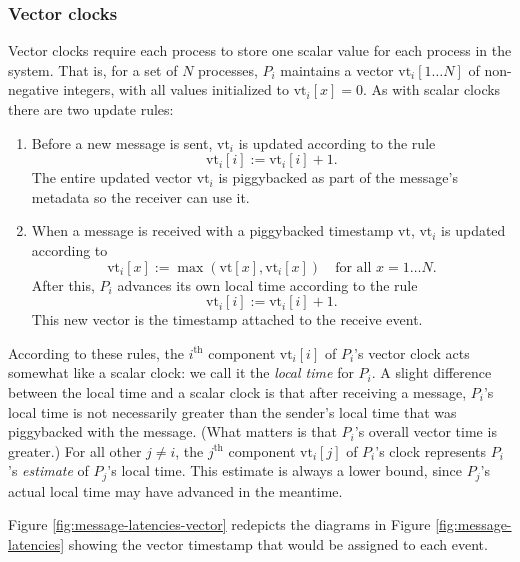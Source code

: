 \documentclass[]             %
{NASA}                       %
\theoremstyle{definition}
\begin{document}
\subsubsection{Vector clocks}
\newcommand{\vt}{\textrm{vt}}

Vector clocks require each process to store one scalar value for each
process in the system. That is, for a set of $N$ processes, $P_i$
maintains a vector $\vt_i[1 \ldots N]$ of non-negative integers, with
all values initialized to $\vt_i[x] = 0$. As with scalar clocks there
are two update rules:
\begin{enumerate}
\item Before a new message is sent, $\vt_i$ is updated according to the rule
  \[\vt_i[i] := \vt_i[i] + 1.\]
  The entire updated vector $\vt_i$ is piggybacked as part of the
  message's metadata so the receiver can use it.
\item When a message is received with a piggybacked timestamp $\vt$,
  $\vt_i$ is updated according to
  \[\vt_i[x] := \max(\vt[x], \vt_i[x]) \quad \textrm{for all $x = 1\ldots N$}.\]
  After this, $P_i$ advances its own local time according to the rule
  \[ \vt_i[i] := \vt_i[i] + 1.\]
  This new vector is the timestamp attached to the receive event.
\end{enumerate}

According to these rules, the $i^\textrm{th}$ component $\vt_i[i]$ of
$P_i$'s vector clock acts somewhat like a scalar clock: we call it the
\emph{local time} for $P_i$. A slight difference between the local
time and a scalar clock is that after receiving a message, $P_i$'s
local time is not necessarily greater than the sender's local time
that was piggybacked with the message. (What matters is that $P_i$'s
overall vector time is greater.) For all other $j \neq i$, the
$j^\textrm{th}$ component $\vt_i[j]$ of $P_i$'s clock represents
$P_i$'s \emph{estimate} of $P_j$'s local time. This estimate is always
a lower bound, since $P_j$'s actual local time may have advanced in
the meantime.

Figure \ref{fig:message-latencies-vector} redepicts the diagrams in
Figure \ref{fig:message-latencies} showing the vector timestamp that
would be assigned to each event.
\end{document}
